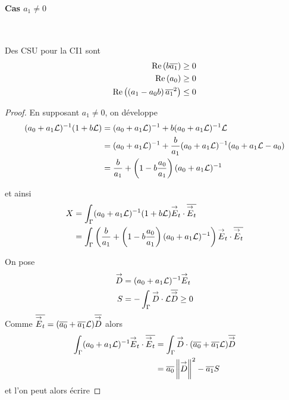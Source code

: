         \paragraph{Cas \(a_1\not=0\)}
          ~
          \begin{prop}
            Des CSU pour la CI1 sont
            \begin{align}
              \operatorname{Re}\left({b}{\overline{a_1}}\right) \ge 0
              \\
              \operatorname{Re}\left(a_0\right) \ge 0
              \\
              \operatorname{Re}\left(\left(a_1-a_0 b\right){{\overline{a_1}}^2}\right) \le 0
            \end{align}
          \end{prop}
          \begin{proof}
            En supposant \(a_1 \not=0\), on développe 
            \begin{align*}
              (a_0 + a_1 \mathcal{L})^{-1}(1 + b \mathcal{L}) &= (a_0 + a_1 \mathcal{L})^{-1} + b (a_0 + a_1 \mathcal{L})^{-1}\mathcal{L}
              \\
              &=(a_0 + a_1 \mathcal{L})^{-1} + \dfrac{b}{a_1} (a_0 + a_1 \mathcal{L})^{-1}(a_0 + a_1\mathcal{L} -a_0)
              \\
              &=\dfrac{b}{a_1} + \left(1-b\dfrac{a_0}{a_1}\right)(a_0+a_1 \mathcal{L})^{-1}
            \end{align*}

            et ainsi
            \begin{align*}
              X &= \int_\Gamma (a_0 + a_1 \mathcal{L})^{-1}(1 + b \mathcal{L}){\overset{\rightarrow}{E}}_t \cdot {\overline{{\overset{\rightarrow}{E}}_t}} 
              \\
              &= \int_\Gamma \left(\dfrac{b}{a_1}  + \left(1-b\dfrac{a_0}{a_1}\right)(a_0+a_1 \mathcal{L})^{-1}\right){\overset{\rightarrow}{E}}_t \cdot {\overline{{\overset{\rightarrow}{E}}_t}} 
            \end{align*}

            On pose
            \begin{align*}
              {\overset{\rightarrow}{D}} &= (a_0 + a_1 \mathcal{L})^{-1}{\overset{\rightarrow}{E}}_t
              \\
              S &= -\int_\Gamma {\overset{\rightarrow}{D}} \cdot \mathcal{L}{\overline{{\overset{\rightarrow}{D}}}} \ge 0
            \end{align*}
            Comme \({\overline{{\overset{\rightarrow}{E}}_t}} = ({\overline{a_0}} + {\overline{a_1}}\mathcal{L}){\overline{{\overset{\rightarrow}{D}}}}\) alors 
            \begin{align*}
              \int_\Gamma (a_0 +a_1 \mathcal{L}) ^{-1}{\overset{\rightarrow}{E}}_t\cdot {\overline{{\overset{\rightarrow}{E}}_t}} 
              &= \int_\Gamma {\overset{\rightarrow}{D}}\cdot ({\overline{a_0}} + {\overline{a_1}}\mathcal{L}){\overline{{\overset{\rightarrow}{D}}}}
              \\
              &= {\overline{a_0}} \left\lVert{\overset{\rightarrow}{D}}\right\rVert^2 - {\overline{a_1}} S
            \end{align*}
            et l'on peut alors écrire


\end{proof}
